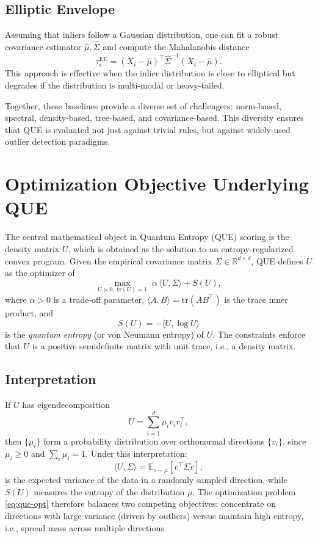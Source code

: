\documentclass[11pt]{article}
\begin{document}
\subsection{Elliptic Envelope}
Assuming that inliers follow a Gaussian distribution, one can fit a robust covariance estimator
$\hat{\mu}, \hat{\Sigma}$ and compute the Mahalanobis distance
\[
\tau_i^{\text{EE}} = (X_i - \hat{\mu})^\top \hat{\Sigma}^{-1} (X_i - \hat{\mu}).
\]
This approach is effective when the inlier distribution is close to elliptical but degrades if the
distribution is multi-modal or heavy-tailed.

\medskip
Together, these baselines provide a diverse set of challengers: norm-based, spectral, density-based,
tree-based, and covariance-based. This diversity ensures that QUE is evaluated not just against trivial
rules, but against widely-used outlier detection paradigms.

\section{Optimization Objective Underlying QUE}
The central mathematical object in Quantum Entropy (QUE) scoring is the density matrix $U$, which is
obtained as the solution to an entropy-regularized convex program. Given the empirical covariance
matrix $\Sigma \in \mathbb{R}^{d \times d}$, QUE defines $U$ as the optimizer of
\begin{equation}
    \max_{U \succeq 0,\; \mathrm{tr}(U) = 1}
    \; \alpha \,\langle U, \Sigma \rangle + S(U),
    \label{eq:que-opt}
\end{equation}
where $\alpha > 0$ is a trade-off parameter, $\langle A,B \rangle = \mathrm{tr}(A B^\top)$ is the trace
inner product, and
\[
    S(U) = -\langle U, \log U \rangle
\]
is the \emph{quantum entropy} (or von Neumann entropy) of $U$. The constraints enforce that $U$ is a
positive semidefinite matrix with unit trace, i.e., a density matrix.

\subsection{Interpretation}
If $U$ has eigendecomposition
\[
    U = \sum_{i=1}^d \mu_i v_i v_i^\top,
\]
then $\{\mu_i\}$ form a probability distribution over orthonormal directions $\{v_i\}$, since
$\mu_i \ge 0$ and $\sum_i \mu_i = 1$. Under this interpretation:
\[
    \langle U, \Sigma \rangle = \mathbb{E}_{v \sim \mu} \left[ v^\top \Sigma v \right],
\]
is the expected variance of the data in a randomly sampled direction, while $S(U)$ measures the entropy
of the distribution $\mu$. The optimization problem \eqref{eq:que-opt} therefore balances two competing
objectives: concentrate on directions with large variance (driven by outliers) versus maintain high
entropy, i.e., spread mass across multiple directions.
\end{document}
